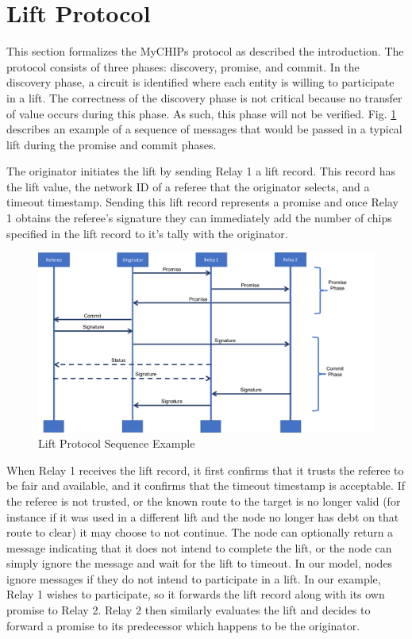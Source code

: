 \documentclass[article, onecolumn, 12pt]{IEEEtran}
\begin{document}
\section{Lift Protocol}
This section formalizes the MyCHIPs protocol as described the introduction. The protocol consists of three phases: discovery, promise, and commit. In the discovery phase, a circuit is identified where each entity is willing to participate in a lift. The correctness of the discovery phase is not critical because no transfer of value occurs during this phase. As such, this phase will not be verified.
Fig. \ref{fig:liftSequence} describes an example of a sequence of messages that would be passed in a typical lift during the promise and commit phases.

The originator initiates the lift by sending Relay 1 a lift record. This record has the lift value, the network ID of a referee that the originator selects, and a timeout timestamp. Sending this lift record represents a promise and once Relay 1 obtains the referee's signature they can immediately add the number of chips specified in the lift record to it's tally with the originator.

\begin{figure}
    \centering
    \includegraphics[scale=0.45]{SequenceDiagramLifeline.png}
    \caption{Lift Protocol Sequence Example}
    \label{fig:liftSequence}
\end{figure}

When Relay 1 receives the lift record, it first confirms that it trusts the referee to be fair and available, and it confirms that the timeout timestamp is acceptable. If the referee is not trusted, or the known route to the target is no longer valid (for instance if it was used in a different lift and the node no longer has debt on that route to clear) it may choose to not continue. The node can optionally return a message indicating that it does not intend to complete the lift, or the node can simply ignore the message and wait for the lift to timeout. In our model, nodes ignore messages if they do not intend to participate in a lift. In our example, Relay 1 wishes to participate, so it forwards the lift record along with its own promise to Relay 2. Relay 2 then similarly evaluates the lift and decides to forward a promise to its predecessor which happens to be the originator. 
\end{document}
